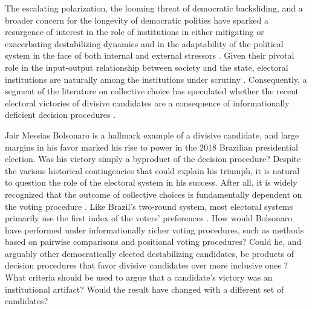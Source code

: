 \documentclass[hidelinks,11pt]{article} \usepackage[utf8]{inputenc}
\begin{document}
The escalating polarization, the looming threat of democratic backsliding, and a broader concern for the longevity of democratic polities have sparked a resurgence of interest in the role of institutions in either mitigating or exacerbating destabilizing dynamics and in the adaptability of the political system in the face of both internal and external stressors \parencite{Bednare2113843118, chiopris2021wolf, ostrom1997meaning}. Given their pivotal role in the input-output relationship between society and the state, electoral institutions are naturally among the institutions under scrutiny \parencite{Wange2021systems}. Consequently, a segment of the literature on collective choice has speculated whether the recent electoral victories of divisive candidates are a consequence of informationally deficient decision procedures \parencite{potthoff2021condorcet, kurrild2018trump, woon2020trump}.

Jair Messias Bolsonaro is a hallmark example of a divisive candidate, and large margins in his favor marked his rise to power in the 2018 Brazilian presidential election. Was his victory simply a byproduct of the decision procedure? Despite the various historical contingencies that could explain his triumph, it is natural to question the role of the electoral system in his success. After all, it is widely recognized that the outcome of collective choices is fundamentally dependent on the voting procedure \parencite{riker1982liberalism}. Like Brazil's two-round system, most electoral systems primarily use the first index of the voters' preferences \parencite{grofman04_if_you_like_alter_vote}. How would Bolsonaro have performed under informationally richer voting procedures, such as methods based on pairwise comparisons and positional voting procedures? Could he, and arguably other democratically elected destabilizing candidates, be products of decision procedures that favor divisive candidates over more inclusive ones \parencite{igersheim22_compar_votin_method}? What criteria should be used to argue that a candidate's victory was an institutional artifact? Would the result have changed with a different set of candidates?
\end{document}

